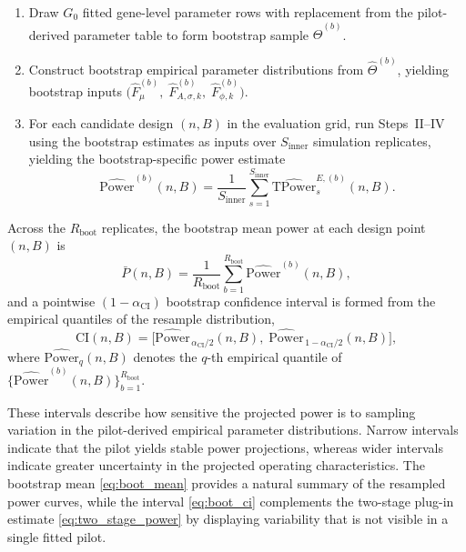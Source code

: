 \documentclass{article}
\begin{document}
\begin{enumerate}
\item Draw $G_0$ fitted gene-level parameter rows with replacement from the
pilot-derived parameter table to form bootstrap sample
$\widehat{\Theta}^{(b)}$.

\item Construct bootstrap empirical parameter distributions from
$\widehat{\Theta}^{(b)}$, yielding bootstrap inputs
\(\bigl(\hat{F}_{\mu}^{(b)},\;\hat{F}_{A,\sigma,k}^{(b)},\;\hat{F}_{\phi,k}^{(b)}\bigr)\).

\item For each candidate design $(n,B)$ in the evaluation grid, run Steps~II--IV
using the bootstrap estimates as inputs over $S_{\mathrm{inner}}$ simulation
replicates, yielding the bootstrap-specific power estimate
\begin{equation}
\widehat{\mathrm{Power}}^{(b)}(n,B)
=
\frac{1}{S_{\mathrm{inner}}}
\sum_{s=1}^{S_{\mathrm{inner}}}
\widehat{\mathrm{TPower}}_s^{E,(b)}(n,B).
\label{eq:boot_power_rep}
\end{equation}
\end{enumerate}

Across the $R_{\mathrm{boot}}$ replicates, the bootstrap mean power at each
design point $(n,B)$ is
\begin{equation}
\bar{P}(n,B)
=
\frac{1}{R_{\mathrm{boot}}}
\sum_{b=1}^{R_{\mathrm{boot}}}
\widehat{\mathrm{Power}}^{(b)}(n,B),
\label{eq:boot_mean}
\end{equation}
and a pointwise $(1-\alpha_{\mathrm{CI}})$ bootstrap confidence interval is
formed from the empirical quantiles of the resample distribution,
\begin{equation}
\mathrm{CI}(n,B)
=
\bigl[
\widehat{\mathrm{Power}}_{\,\alpha_{\mathrm{CI}}/2}(n,B),\;
\widehat{\mathrm{Power}}_{\,1-\alpha_{\mathrm{CI}}/2}(n,B)
\bigr],
\label{eq:boot_ci}
\end{equation}
where $\widehat{\mathrm{Power}}_q(n,B)$ denotes the $q$-th empirical quantile
of $\bigl\{\widehat{\mathrm{Power}}^{(b)}(n,B)\bigr\}_{b=1}^{R_{\mathrm{boot}}}$.

These intervals describe how sensitive the projected power is to sampling
variation in the pilot-derived empirical parameter distributions. Narrow
intervals indicate that the pilot yields stable power projections, whereas
wider intervals indicate greater uncertainty in the projected operating
characteristics. The bootstrap mean
\eqref{eq:boot_mean} provides a natural summary of the resampled power curves,
while the interval \eqref{eq:boot_ci} complements the two-stage plug-in
estimate \eqref{eq:two_stage_power} by displaying variability that is not
visible in a single fitted pilot.
\end{document}
